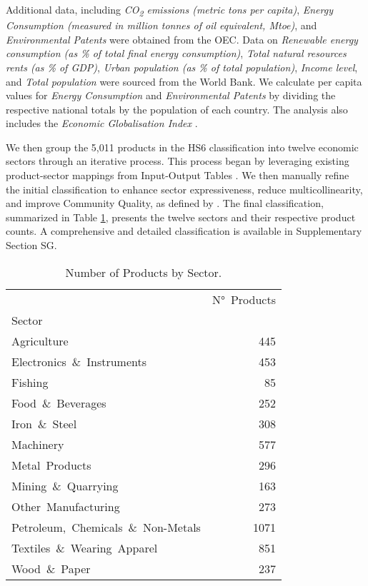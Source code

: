\documentclass[10pt]{article}
\begin{document}
Additional data, including \textit{CO\textsubscript{2} emissions (metric tons per capita)}, \textit{Energy Consumption (measured in million tonnes of oil equivalent, Mtoe)}, and \textit{Environmental Patents} were obtained from the OEC. Data on \textit{Renewable energy consumption (as \% of total final energy consumption)}, \textit{Total natural resources rents (as \% of GDP)}, \textit{Urban population (as \% of total population)}, \textit{Income level}, and \textit{Total population} were sourced from the World Bank. We calculate per capita values for \textit{Energy Consumption} and \textit{Environmental Patents} by dividing the respective national totals by the population of each country. The analysis also includes the \textit{Economic Globalisation Index} \citep{KOFGlobalisationIndex}.

We then group the 5,011 products in the HS6 classification into twelve economic sectors through an iterative process. This process began by leveraging existing product-sector mappings from Input-Output Tables \citep{lenzenMappingStructureWorld2012}. We then manually refine the initial classification to enhance sector expressiveness, reduce multicollinearity, and improve Community Quality, as defined by \cite{hausmann2014atlas}. The final classification, summarized in Table \ref{tab:sector-products}, presents the twelve sectors and their respective product counts. A comprehensive and detailed classification is available in Supplementary Section SG.


\begin{table}[ht]
      \centering
      \caption{Number of Products by Sector.}
      \begin{tabular}{lr}
            \toprule
            & N°\ Products \\
 Sector &  \\
            \midrule
 Agriculture & 445 \\
 Electronics\ \&\ Instruments & 453 \\
 Fishing & 85 \\
 Food\ \&\ Beverages & 252 \\
 Iron\ \&\ Steel & 308 \\
 Machinery & 577 \\
 Metal\ Products & 296 \\
 Mining\ \&\ Quarrying & 163 \\
 Other\ Manufacturing & 273 \\
 Petroleum,\ Chemicals\ \&\ Non-Metals & 1071 \\
 Textiles\ \&\ Wearing\ Apparel & 851 \\
 Wood\ \&\ Paper & 237 \\
            \bottomrule
      \end{tabular}
      \label{tab:sector-products}
\end{table}
\end{document}
